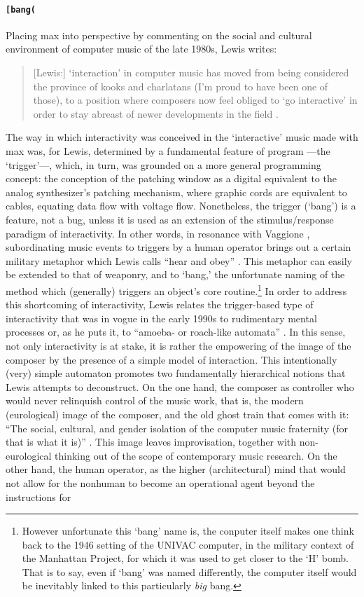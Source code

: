 \paragraph{\texttt{[bang(}}
Placing \gls{max} into perspective by commenting on the social and cultural environment of computer music of the late 1980s, Lewis writes:

\begin{quote}
	[Lewis:] `interaction' in computer music has moved from being considered the province of kooks and charlatans (I'm proud to have been one of those), to a position where composers now feel obliged to `go interactive' in order to stay abreast of newer developments in the field \parencite[11]{Lew93:Put}.
\end{quote}

The way in which interactivity was conceived in the `interactive' music made with \gls{max} was, for Lewis, determined by a fundamental feature of program ---the `trigger'---, which, in turn, was grounded on a more general programming concept: the conception of the patching window as a digital equivalent to the analog synthesizer's patching mechanism, where graphic cords are equivalent to cables, equating data flow with voltage flow. Nonetheless, the trigger (`bang') is a feature, not a bug, unless it is used as an extension of the stimulus/response paradigm of interactivity. In other words, in resonance with Vaggione , subordinating music events to triggers by a human operator brings out a certain military metaphor which Lewis calls ``hear and obey'' \parencite[11]{Lew93:Put}. This metaphor can easily be extended to that of weaponry, and to `bang,' the unfortunate naming of the method which (generally) triggers an object's core routine.\footnote{However unfortunate this `bang' name is, the conputer itself makes one think back to the 1946 setting of the UNIVAC computer, in the military context of the Manhattan Project, for which it was used to get closer to the `H' bomb. That is to say, even if `bang' was named differently, the computer itself would be inevitably linked to this particularly \textit{big} bang.} In order to address this shortcoming of interactivity, Lewis relates the trigger-based type of interactivity that was in vogue in the early 1990s to rudimentary mental processes or, as he puts it, to ``amoeba- or roach-like automata'' \parencite[11]{Lew93:Put}. In this sense, not only interactivity is at stake, it is rather the empowering of the image of the composer by the presence of a simple model of interaction. This intentionally (very) simple automaton promotes two fundamentally hierarchical notions that Lewis attempts to deconstruct. On the one hand, the composer as controller who would never relinquish control of the music work, that is, the modern (eurological) image of the composer, and the old ghost train that comes with it: ``The social, cultural, and gender isolation of the computer music fraternity (for that is what it is)'' \parencite[11]{Lew93:Put}. This image leaves improvisation, together with non-eurological thinking out of the scope of contemporary music research. On the other hand, the human operator, as the higher (architectural) mind that would not allow for the nonhuman to become an operational agent beyond the instructions for 